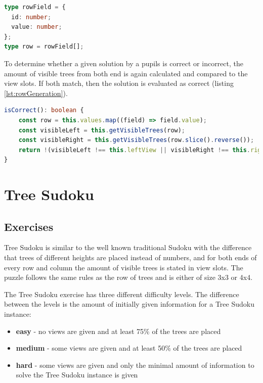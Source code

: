 \begin{lstlisting}[language=TypeScript,caption={Definition of the custom row and rowField type},label={lst:rowType}]
type rowField = {
  id: number;
  value: number;
};
type row = rowField[];
\end{lstlisting}

To determine whether a given solution by a pupils is correct or incorrect, the amount of visible trees from both end is again calculated and compared to the view slots. If both match, then the solution is evaluated as correct (listing \ref{lst:rowGeneration}).

\begin{lstlisting}[language=TypeScript,caption={Correctness check of a row of tree exercise solution},label={lst:rowCorrectness}]
isCorrect(): boolean {
    const row = this.values.map((field) => field.value);
    const visibleLeft = this.getVisibleTrees(row);
    const visibleRight = this.getVisibleTrees(row.slice().reverse());
    return !(visibleLeft !== this.leftView || visibleRight !== this.rightView);
}
\end{lstlisting}

\section{Tree Sudoku}
\label{section:treeSudoku}

\subsection{Exercises}
Tree Sudoku is similar to the well known traditional Sudoku with the difference that trees of different heights are placed instead of numbers, and for both ends of every row and column the amount of visible trees is stated in view slots. The puzzle follows the same rules as the row of trees and is either of size 3x3 or 4x4.

The Tree Sudoku exercise has three different difficulty levels. The difference between the levels is the amount of initially given information for a Tree Sudoku instance:

\begin{itemize}
    \item \textbf{easy} - no views are given and at least 75\% of the trees are placed
    \item \textbf{medium} - some views are given and at least 50\% of the trees are placed
    \item \textbf{hard} - some views are given and only the minimal amount of information to solve the Tree Sudoku instance is given
\end{itemize}

